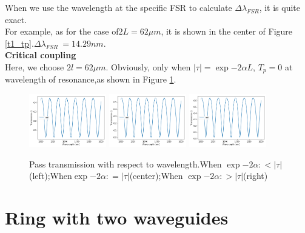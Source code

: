 \documentclass[fontsize=11pt]{scrartcl}
\begin{document}
When we use the wavelength at the specific FSR to calculate $\Delta\lambda_{FSR}$, it is quite exact.\\
For example, as for the case of$2L=62\mu m$, it is shown in the center of Figure \ref{t1_tp}.$\Delta\lambda_{FSR}~=14.29 nm$.\\
\textbf{Critical coupling}   \\
Here, we choose $2l=62\mu m$. Obviously, only when $|\tau |=\exp{-2\alpha L}$, $T_p=0$ at wavelength of resonance,as shown in Figure \ref{t1_tp_critical}.
\begin{figure}[ht]
    \centering
    \includegraphics[width=0.3\textwidth]{img/T1_ccs.png}
    \includegraphics[width=0.3\textwidth]{img/T1_cc.png}
    \includegraphics[width=0.3\textwidth]{img/T1_ccl.png}
    \caption{Pass transmission with respect to wavelength.When $\exp{-2\alpha:}<|\tau|$(left);When$\exp{-2\alpha:}=|\tau|$(center);When $\exp{-2\alpha:}>|\tau|$(right)}
    \label{t1_tp_critical}
\end{figure}


\section{Ring with two waveguides}
\end{document}
